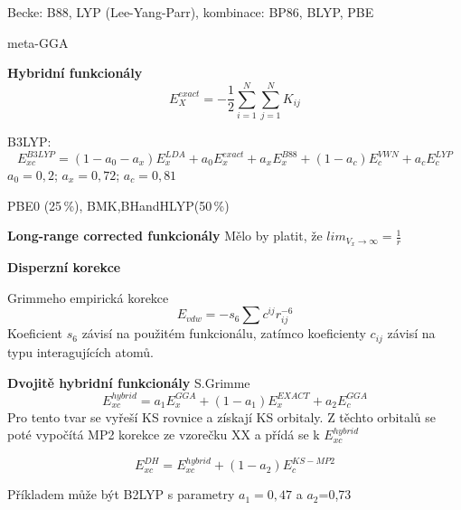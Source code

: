 Becke: B88, LYP (Lee-Yang-Parr),
kombinace: BP86, BLYP, PBE

meta-GGA

\textbf{Hybridní funkcionály}
\begin{equation}
E_X^{exact}=-\frac{1}{2}\sum_{i=1}^N\sum_{j=1}^N K_{ij}
\end{equation}

B3LYP:
\begin{equation}
E_{xc}^{B3LYP}=(1-a_0-a_x)E_x^{LDA}+a_0E_x^{exact}+a_xE_x^{B88}+(1-a_c)E_c^{VWN}+a_c E_c^{LYP}
\end{equation}
$a_0=0,2$; $a_x=0,72$; $a_c=0,81$

PBE0 (25\,\%), BMK,BHandHLYP(50\,\%)

\textbf{Long-range corrected funkcionály}
Mělo by platit, že $lim_{V_x\to \infty}=\frac{1}{r}$

\textbf{Disperzní korekce}

Grimmeho empirická korekce
\begin{equation}
E_{vdw}=-s_6\sum c^{ij}r_{ij}^{-6}
\end{equation}
Koeficient $s_6$ závisí na použitém funkcionálu, zatímco koeficienty $c_{ij}$ závisí na typu interagujících atomů.

\textbf{Dvojitě hybridní funkcionály}
S.Grimme 
\begin{equation}
E_{xc}^{hybrid}=a_1E_x^{GGA}+(1-a_1)E_x^{EXACT}+a_2E_c^{GGA}
\end{equation}
Pro tento tvar se vyřeší KS rovnice a získají KS orbitaly. Z těchto orbitalů se poté vypočítá MP2 korekce
ze vzorečku XX a přídá se k $E_{xc}^{hybrid}$

\begin{equation}
E_{xc}^{DH}=E_{xc}^{hybrid}+(1-a_2)E_c^{KS-MP2}
\end{equation}

Příkladem může být B2LYP s parametry $a_1=0,47$ a $a_2$=0,73

